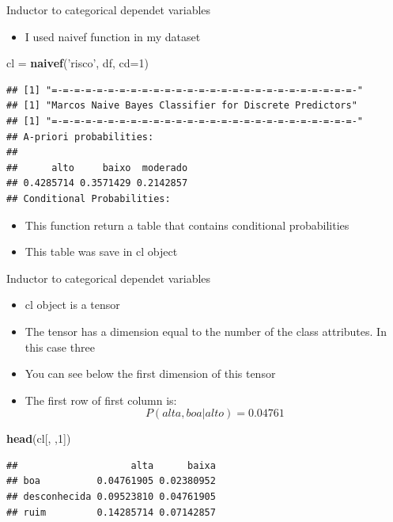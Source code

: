 \documentclass[
  10pt,
  ignorenonframetext,
]{beamer}
\newenvironment{Shaded}{\begin{snugshade}}{\end{snugshade}}
\newcommand{\DataTypeTok}[1]{\textcolor[rgb]{0.13,0.29,0.53}{#1}}
\newcommand{\DecValTok}[1]{\textcolor[rgb]{0.00,0.00,0.81}{#1}}
\newcommand{\KeywordTok}[1]{\textcolor[rgb]{0.13,0.29,0.53}{\textbf{#1}}}
\newcommand{\NormalTok}[1]{#1}
\newcommand{\StringTok}[1]{\textcolor[rgb]{0.31,0.60,0.02}{#1}}
\providecommand{\tightlist}{%
  \setlength{\itemsep}{0pt}\setlength{\parskip}{0pt}}
\begin{document}
\begin{frame}[fragile]{Inductor to categorical dependet variables}
\protect\hypertarget{inductor-to-categorical-dependet-variables}{}

\begin{itemize}
\tightlist
\item
  I used naivef function in my dataset
\end{itemize}

\begin{Shaded}
\begin{Highlighting}[]
\NormalTok{cl =}\StringTok{ }\KeywordTok{naivef}\NormalTok{(}\StringTok{'risco'}\NormalTok{, df, }\DataTypeTok{cd=}\DecValTok{1}\NormalTok{)}
\end{Highlighting}
\end{Shaded}

\begin{verbatim}
## [1] "=-=-=-=-=-=-=-=-=-=-=-=-=-=-=-=-=-=-=-=-=-=-=-=-=-=-=-"
## [1] "Marcos Naive Bayes Classifier for Discrete Predictors"
## [1] "=-=-=-=-=-=-=-=-=-=-=-=-=-=-=-=-=-=-=-=-=-=-=-=-=-=-=-"
## A-priori probabilities:
## 
##      alto     baixo  moderado 
## 0.4285714 0.3571429 0.2142857 
## Conditional Probabilities:
\end{verbatim}

\begin{itemize}
\tightlist
\item
  This function return a table that contains conditional probabilities
\item
  This table was save in cl object
\end{itemize}

\end{frame}

\begin{frame}[fragile]{Inductor to categorical dependet variables}
\protect\hypertarget{inductor-to-categorical-dependet-variables-1}{}

\begin{itemize}
\tightlist
\item
  cl object is a tensor
\item
  The tensor has a dimension equal to the number of the class
  attributes. In this case three
\item
  You can see below the first dimension of this tensor
\item
  The first row of first column is: \[P(alta, boa|alto)= 0.04761\]
\end{itemize}

\begin{Shaded}
\begin{Highlighting}[]
\KeywordTok{head}\NormalTok{(cl[, ,}\DecValTok{1}\NormalTok{])}
\end{Highlighting}
\end{Shaded}

\begin{verbatim}
##                    alta      baixa
## boa          0.04761905 0.02380952
## desconhecida 0.09523810 0.04761905
## ruim         0.14285714 0.07142857
\end{verbatim}

\end{frame}
\end{document}
